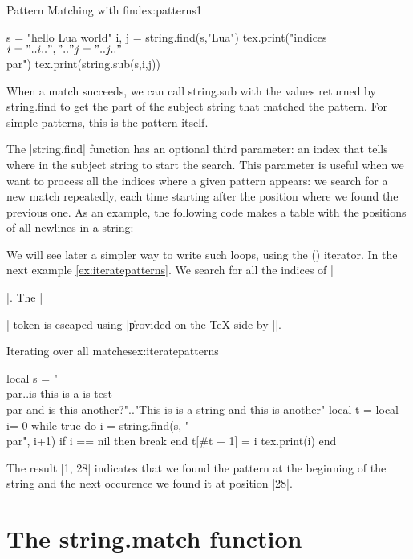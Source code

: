 \begin{texexample}{Pattern Matching with find}{ex:patterns1}
\begin{luacode*}
s = "hello Lua world"
i, j = string.find(s,"Lua")
tex.print("indices $i="..i..",".."j="..j.."$\\par")
tex.print(string.sub(s,i,j))
\end{luacode*}
\end{texexample}

\noindent{}
When a match succeeds, we can call string.sub with the values returned by
string.find to get the part of the subject string that matched the pattern. For
simple patterns, this is the pattern itself.

The |string.find| function has an optional third parameter: an index that
tells where in the subject string to start the search. This parameter is useful
when we want to process all the indices where a given pattern appears: we
search for a new match repeatedly, each time starting after the position where
we found the previous one. As an example, the following code makes a table
with the positions of all newlines in a string:

We will see later a simpler way to write such loops, using the ()
iterator. In the next example \ref{ex:iteratepatterns}. We search for all the indices
of |\par|. The |\par| token is escaped using |\| provided on the TeX side by |\string|.

\begin{texexample}{Iterating over all matches}{ex:iteratepatterns} 

\edef\tempstring{\string\\par..is this is a is test \string\\par and is this another?}
\begin{luacode}
local s = "\tempstring".."This is is a string and this is another"
local t = {}
local i= 0
while true do
    i = string.find(s, "\\par", i+1)
    if i == nil then break end
    t[#t + 1] = i
    tex.print(i)
end
   
\end{luacode}
\end{texexample}
The result |1, 28| indicates that we found the pattern at the beginning of the string and the next occurence we found it at position |28|.

\section{The string.match function}


